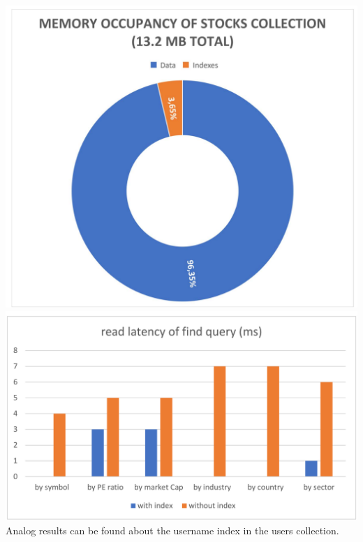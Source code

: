 \includegraphics[scale=0.11]{img/memory_mongo.png}
\includegraphics[scale=0.11]{img/latency_mongo.png}\\

\noindent Analog results can be found about the username index in the users collection.

